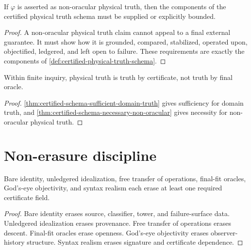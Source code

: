 \begin{theorem}
\label{thm:certified-schema-necessary-non-oracular}
If $\varphi$ is asserted as non-oracular physical truth, then the components of the certified physical truth schema must be supplied or explicitly bounded.
\end{theorem}

\begin{proof}
A non-oracular physical truth claim cannot appeal to a final external guarantee. It must show how it is grounded, compared, stabilized, operated upon, objectified, ledgered, and left open to failure. These requirements are exactly the components of \autoref{def:certified-physical-truth-schema}.
\end{proof}

\begin{corollary}
\label{cor:physical-truth-certificate-truth}
Within finite inquiry, physical truth is truth by certificate, not truth by final oracle.
\end{corollary}

\begin{proof}
\autoref{thm:certified-schema-sufficient-domain-truth} gives sufficiency for domain truth, and \autoref{thm:certified-schema-necessary-non-oracular} gives necessity for non-oracular physical truth.
\end{proof}

\section{Non-erasure discipline}
\label{sec:non-erasure-discipline}

\begin{theorem}
\label{thm:unsafe-truth-moves-erase-certificates}
Bare identity, unledgered idealization, free transfer of operations, final-fit oracles, God's-eye objectivity, and syntax realism each erase at least one required certificate field.
\end{theorem}

\begin{proof}
Bare identity erases source, classifier, tower, and failure-surface data. Unledgered idealization erases provenance. Free transfer of operations erases descent. Final-fit oracles erase openness. God's-eye objectivity erases observer-history structure. Syntax realism erases signature and certificate dependence.
\end{proof}

